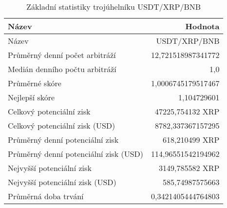 \begin{table}\centering
\caption{Základní statistiky trojúhelníku USDT/XRP/BNB}
\label{USDTXRPBNB_stats}
\begin{tabular}{|| l | r ||}
\hline Název & Hodnota \\ 
\hline\hline Název & USDT/XRP/BNB \\ 
\hline Průměrný denní počet arbitráží & 12,721518987341772 \\ 
\hline Medián denního počtu arbitráží & 1,0 \\ 
\hline Průměrné skóre & 1,0006745179517467 \\ 
\hline Nejlepší skóre & 1,104729601 \\ 
\hline Celkový potenciální zisk & 47225,754132 XRP \\ 
\hline Celkový potenciální zisk (USD) & 8782,337367157295 \\ 
\hline Průměrný denní potenciální zisk & 618,210499 XRP \\ 
\hline Průměrný denní potenciální zisk (USD) & 114,96551542194962 \\ 
\hline Nejvyšší potenciální zisk & 3149,785582 XRP \\ 
\hline Nejvyšší potenciální zisk (USD) & 585,74987575663 \\ 
\hline Průměrná doba trvání & 0,3421405444764803 \\ 
\hline
\end{tabular}
\end{table}
